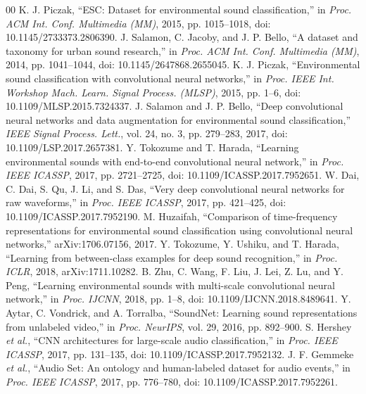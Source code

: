 \documentclass[conference]{IEEEtran}
\begin{document}
\begin{thebibliography}{00}
 K. J. Piczak, ``ESC: Dataset for environmental sound classification,'' in \textit{Proc. ACM Int. Conf. Multimedia (MM)}, 2015, pp. 1015--1018, doi: 10.1145/2733373.2806390.
 J. Salamon, C. Jacoby, and J. P. Bello, ``A dataset and taxonomy for urban sound research,'' in \textit{Proc. ACM Int. Conf. Multimedia (MM)}, 2014, pp. 1041--1044, doi: 10.1145/2647868.2655045.
 K. J. Piczak, ``Environmental sound classification with convolutional neural networks,'' in \textit{Proc. IEEE Int. Workshop Mach. Learn. Signal Process. (MLSP)}, 2015, pp. 1--6, doi: 10.1109/MLSP.2015.7324337.
 J. Salamon and J. P. Bello, ``Deep convolutional neural networks and data augmentation for environmental sound classification,'' \textit{IEEE Signal Process. Lett.}, vol. 24, no. 3, pp. 279--283, 2017, doi: 10.1109/LSP.2017.2657381.
 Y. Tokozume and T. Harada, ``Learning environmental sounds with end-to-end convolutional neural network,'' in \textit{Proc. IEEE ICASSP}, 2017, pp. 2721--2725, doi: 10.1109/ICASSP.2017.7952651.
 W. Dai, C. Dai, S. Qu, J. Li, and S. Das, ``Very deep convolutional neural networks for raw waveforms,'' in \textit{Proc. IEEE ICASSP}, 2017, pp. 421--425, doi: 10.1109/ICASSP.2017.7952190.
 M. Huzaifah, ``Comparison of time-frequency representations for environmental sound classification using convolutional neural networks,'' arXiv:1706.07156, 2017.
 Y. Tokozume, Y. Ushiku, and T. Harada, ``Learning from between-class examples for deep sound recognition,'' in \textit{Proc. ICLR}, 2018, arXiv:1711.10282.
 B. Zhu, C. Wang, F. Liu, J. Lei, Z. Lu, and Y. Peng, ``Learning environmental sounds with multi-scale convolutional neural network,'' in \textit{Proc. IJCNN}, 2018, pp. 1--8, doi: 10.1109/IJCNN.2018.8489641.
 Y. Aytar, C. Vondrick, and A. Torralba, ``SoundNet: Learning sound representations from unlabeled video,'' in \textit{Proc. NeurIPS}, vol. 29, 2016, pp. 892--900.
 S. Hershey \textit{et al.}, ``CNN architectures for large-scale audio classification,'' in \textit{Proc. IEEE ICASSP}, 2017, pp. 131--135, doi: 10.1109/ICASSP.2017.7952132.
 J. F. Gemmeke \textit{et al.}, ``Audio Set: An ontology and human-labeled dataset for audio events,'' in \textit{Proc. IEEE ICASSP}, 2017, pp. 776--780, doi: 10.1109/ICASSP.2017.7952261.

\end{thebibliography}
\end{document}
